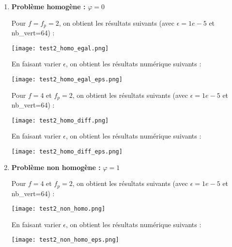 \begin{enumerate}[label=\textbullet]
	\item \textbf{Problème homogène :} $\varphi=0$
	
	Pour $f=f_p=2$, on obtient les résultats suivants (avec $\epsilon=1e-5$ et nb\_vert=64) :
	
	\begin{minipage}{\linewidth}
		\centering
		\texttt{[image: test2\_homo\_egal.png]}
	\end{minipage}

	En faisant varier $\epsilon$, on obtient les résultats numérique suivants :
	
	\begin{minipage}{\linewidth}
		\centering
		\texttt{[image: test2\_homo\_egal\_eps.png]}
	\end{minipage}
	
	Pour $f=4$ et $f_p=2$, on obtient les résultats suivants (avec $\epsilon=1e-5$ et nb\_vert=64) :
	
	\begin{minipage}{\linewidth}
		\centering
		\texttt{[image: test2\_homo\_diff.png]}
	\end{minipage}
	
	En faisant varier $\epsilon$, on obtient les résultats numérique suivants :
	
	\begin{minipage}{\linewidth}
		\centering
		\texttt{[image: test2\_homo\_diff\_eps.png]}
	\end{minipage}
	
	\newpage
	
	\item \textbf{Problème non homogène :} $\varphi=1$
	
	Pour $f=4$ et $f_p=2$, on obtient les résultats suivants (avec $\epsilon=1e-5$ et nb\_vert=64) :
	
	\begin{minipage}{\linewidth}
		\centering
		\texttt{[image: test2\_non\_homo.png]}
	\end{minipage}
	
	En faisant varier $\epsilon$, on obtient les résultats numérique suivants :
	
	\begin{minipage}{\linewidth}
		\centering
		\texttt{[image: test2\_non\_homo\_eps.png]}
	\end{minipage}
	
\end{enumerate}

